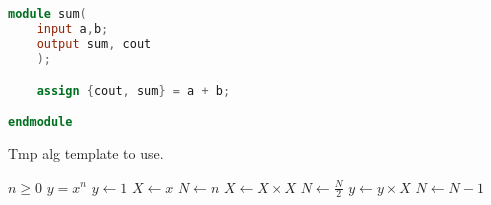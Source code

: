 \appendix
\begin{appendices}
\renewcommand{\thechapter}{\Roman{chapter}}

	
	
\chapter{}\label{a1}
\begin{lstlisting}[language=Verilog, caption= tmp code template,label={label:1}] 
module sum(
	input a,b;
	output sum, cout
	);

	assign {cout, sum} = a + b;

endmodule
\end{lstlisting}


\begin{algorithm}
\caption{Tmp alg template to use.}\label{alg:cap}
\begin{algorithmic}
\Require $n \geq 0$
\Ensure $y = x^n$
\State $y \gets 1$
\State $X \gets x$
\State $N \gets n$
    \State $X \gets X \times X$
    \State $N \gets \frac{N}{2}$  
    \State $y \gets y \times X$
    \State $N \gets N - 1$
\EndIf
\EndWhile
\end{algorithmic}
\end{algorithm}

\end{appendices}
